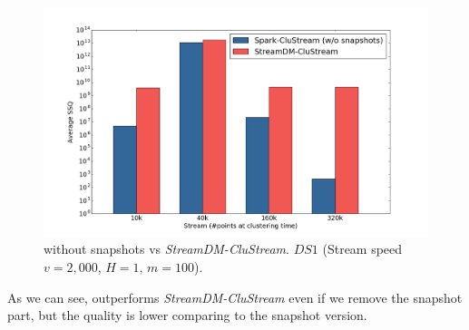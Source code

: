 \begin{figure}[h]
 \centering
 \includegraphics[scale=0.24]{./styles/comparisonNoSnaps.png}
 \caption{\our without snapshots vs \textit{StreamDM-CluStream}. $DS1$ (Stream speed $v=2,000$, $H=1$, $m=100$).}
 \label{fig:comparisonNoSnaps}
\end{figure}
As we can see, \our outperforms \textit{StreamDM-CluStream} even if we remove the snapshot part, but the quality is lower comparing to the snapshot version.

